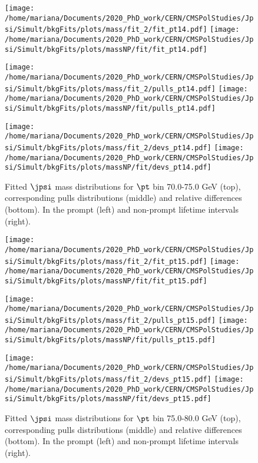 \pagebreak

\begin{figure}[h!]
\centering
\texttt{[image: /home/mariana/Documents/2020\_PhD\_work/CERN/CMSPolStudies/Jpsi/Simult/bkgFits/plots/mass/fit\_2/fit\_pt14.pdf]}
\texttt{[image: /home/mariana/Documents/2020\_PhD\_work/CERN/CMSPolStudies/Jpsi/Simult/bkgFits/plots/massNP/fit/fit\_pt14.pdf]}

\texttt{[image: /home/mariana/Documents/2020\_PhD\_work/CERN/CMSPolStudies/Jpsi/Simult/bkgFits/plots/mass/fit\_2/pulls\_pt14.pdf]}
\texttt{[image: /home/mariana/Documents/2020\_PhD\_work/CERN/CMSPolStudies/Jpsi/Simult/bkgFits/plots/massNP/fit/pulls\_pt14.pdf]}

\texttt{[image: /home/mariana/Documents/2020\_PhD\_work/CERN/CMSPolStudies/Jpsi/Simult/bkgFits/plots/mass/fit\_2/devs\_pt14.pdf]}
\texttt{[image: /home/mariana/Documents/2020\_PhD\_work/CERN/CMSPolStudies/Jpsi/Simult/bkgFits/plots/massNP/fit/devs\_pt14.pdf]}
\caption{Fitted $\jpsi$ mass distributions for $\pt$ bin 70.0-75.0 GeV (top), corresponding pulls distributions (middle) and relative differences (bottom). In the prompt (left) and non-prompt lifetime intervals (right).}\label{f:m_fit_14}
\end{figure}

\pagebreak

\begin{figure}[h!]
\centering
\texttt{[image: /home/mariana/Documents/2020\_PhD\_work/CERN/CMSPolStudies/Jpsi/Simult/bkgFits/plots/mass/fit\_2/fit\_pt15.pdf]}
\texttt{[image: /home/mariana/Documents/2020\_PhD\_work/CERN/CMSPolStudies/Jpsi/Simult/bkgFits/plots/massNP/fit/fit\_pt15.pdf]}

\texttt{[image: /home/mariana/Documents/2020\_PhD\_work/CERN/CMSPolStudies/Jpsi/Simult/bkgFits/plots/mass/fit\_2/pulls\_pt15.pdf]}
\texttt{[image: /home/mariana/Documents/2020\_PhD\_work/CERN/CMSPolStudies/Jpsi/Simult/bkgFits/plots/massNP/fit/pulls\_pt15.pdf]}

\texttt{[image: /home/mariana/Documents/2020\_PhD\_work/CERN/CMSPolStudies/Jpsi/Simult/bkgFits/plots/mass/fit\_2/devs\_pt15.pdf]}
\texttt{[image: /home/mariana/Documents/2020\_PhD\_work/CERN/CMSPolStudies/Jpsi/Simult/bkgFits/plots/massNP/fit/devs\_pt15.pdf]}
\caption{Fitted $\jpsi$ mass distributions for $\pt$ bin 75.0-80.0 GeV (top), corresponding pulls distributions (middle) and relative differences (bottom). In the prompt (left) and non-prompt lifetime intervals (right).}\label{f:m_fit_15}
\end{figure}

